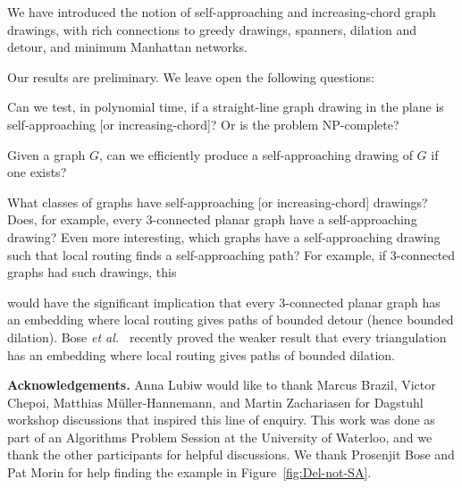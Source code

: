 \documentclass[11pt]{article}
\newcommand{\etal}{{\em et al.~}}
\newcommand{\changed}[1]{#1}
\begin{document}
We have introduced the notion of self-approaching and increasing-chord graph drawings, with rich connections to greedy drawings, spanners, dilation and detour, and minimum Manhattan networks.

Our results are preliminary.  We leave open the following questions:
\begin{itemize}
\item Can we test, in polynomial time, if a straight-line graph drawing in the plane is self-approaching [or increasing-chord]? Or is the problem NP-complete?
{\changed
\item Given a graph $G$, can we efficiently produce a self-approaching drawing of $G$ if one exists?


\item What classes of graphs have self-approaching [or increasing-chord] drawings? Does, for example, every 3-connected planar graph have a self-approaching drawing?  Even more interesting, which graphs have a self-approaching drawing such that
local routing finds a self-approaching path?
For example, if 3-connected graphs had such drawings, this}
would have the significant implication that every 3-connected planar graph has an embedding where local routing gives paths of bounded detour (hence bounded dilation).
Bose \etal\cite{Bose:theta6:2012} recently proved the weaker result that every triangulation has an embedding where local routing gives paths of bounded dilation.
\end{itemize}



\medskip\noindent
{\bf Acknowledgements.}  Anna Lubiw would like to thank Marcus Brazil, Victor Chepoi, Matthias M\"uller-Hannemann, and Martin Zachariasen for Dagstuhl workshop discussions that inspired this line of enquiry. This work was done as part of an Algorithms Problem Session at the University of Waterloo, and we thank the other participants for helpful discussions.  We thank Prosenjit Bose and Pat Morin for help finding the example in Figure~\ref{fig:Del-not-SA}.



\end{document}
